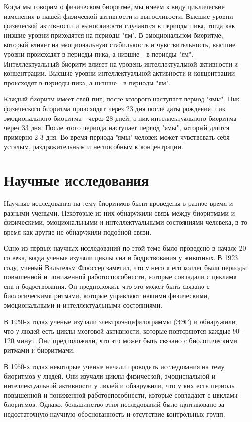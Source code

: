 Когда мы говорим о физическом биоритме, мы имеем в виду циклические изменения в нашей физической активности и выносливости. Высшие уровни физической активности и выносливости случаются в периоды пика, тогда как низшие уровни приходятся на периоды "ям". В эмоциональном биоритме, который влияет на эмоциональную стабильность и чувствительность, высшие уровни происходят в периоды пика, а низшие - в периоды "ям". Интеллектуальный биоритм влияет на уровень интеллектуальной активности и концентрации. Высшие уровни интеллектуальной активности и концентрации происходят в периоды пика, а низшие - в периоды "ям". 

Каждый биоритм имеет свой пик, после которого наступает период "ямы". Пик физического биоритма происходит через 23 дня после даты рождения, пик эмоционального биоритма - через 28 дней, а пик интеллектуального биоритма - через 33 дня. После этого периода наступает период "ямы", который длится примерно 2-3 дня. Во время периода "ямы" человек может чувствовать себя усталым, раздражительным и неспособным к концентрации. 

\newpage 

\section{Научные исследования}

Научные исследования на тему биоритмов были проведены в разное время и разными учеными. Некоторые из них обнаружили связь между биоритмами и физическими, эмоциональными и интеллектуальными состояниями человека, в то время как другие не обнаружили подобной связи.

Одно из первых научных исследований по этой теме было проведено в начале 20-го века, когда ученые изучали циклы сна и бодрствования у животных. В 1923 году, ученый Вильгельм Флюссер заметил, что у него и его коллег были периоды повышенной и пониженной работоспособности, которые совпадали с циклами сна и бодрствования. Он предположил, что это может быть связано с биологическими ритмами, которые управляют нашими физическими, эмоциональными и интеллектуальными состояниями.

В 1950-х годах ученые изучали электроэнцефалограммы (ЭЭГ) и обнаружили, что у людей есть циклы мозговой активности, которые повторяются каждые 90-120 минут. Они предположили, что это может быть связано с биологическими ритмами и биоритмами.

В 1960-х годах некоторые ученые начали проводить исследования на тему биоритмов у людей. Они изучали циклы физической, эмоциональной и интеллектуальной активности у людей и обнаружили, что у них есть периоды повышенной и пониженной работоспособности, которые совпадают с циклами биоритмов. Однако, большинство этих исследований было критиковано за недостаточную научную обоснованность и отсутствие контрольных групп.

